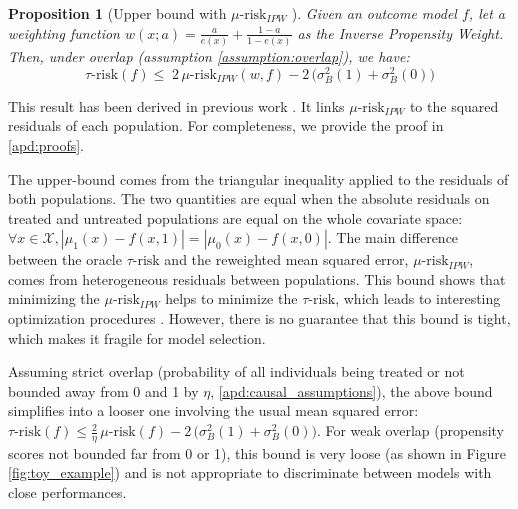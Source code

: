 \documentclass{report}
\newtheorem{proposition}{Proposition}
\begin{document}
\begin{proposition}[Upper bound with $\mu \text{-risk}_{IPW}$
  ]\label{theory:prop:mu_risk_ipw_bound}
  \citep{johansson2022generalization} Given an outcome model $f$, let a
  weighting function $w(x; a) = \frac{a}{e(x)} + \frac{1-a}{1-e(x)}$ as the
  Inverse Propensity Weight. Then, under overlap (assumption
  \ref{assumption:overlap}), we have:
  \begin{equation*}
    \tau\text{-risk}(f) \leq \; 2 \, \mu\text{-risk}_{IPW}(w, f)
    - 2 \, \big(\sigma^2_{B}(1) +  \sigma^2_{B}(0)\big)
  \end{equation*}
\end{proposition}
This result has been derived in previous work
\citep{johansson2022generalization}. It links $\mu\text{-risk}_{IPW}$ to
the squared residuals of each population. For completeness, we provide the proof in \ref{apd:proofs}.

The upper-bound comes from the triangular inequality applied to the residuals of
both populations. The two quantities are equal when the
absolute residuals on treated and untreated populations are equal on the
whole covariate space:
$\forall x \in \mathcal X, |\mu_1(x) - f(x, 1)| = |\mu_0(x) - f(x, 0)|$.
The main difference between the oracle $\tau \text{-risk}$ and the
reweighted mean squared error, $\mu\text{-risk}_{IPW}$, comes from heterogeneous
residuals between populations.
%
This bound shows that minimizing the $\mu\text{-risk}_{IPW}$ helps to
minimize the $\tau\text{-risk}$, which leads to
interesting optimization procedures \citep{johansson2022generalization}. However, there is no
guarantee that this bound is tight, which makes it fragile for model
selection.

Assuming strict overlap (probability of all individuals being treated or not
bounded away from 0 and 1 by $\eta$, \ref{apd:causal_assumptions}), the
above bound simplifies into a looser one involving the usual mean squared error:
$\tau\text{-risk}(f)\leq \frac{2}{\eta}\, \mu\text{-risk}(f) -  2 \, \big(\sigma^2_{B}(1) +  \sigma^2_{B}(0)\big)$. For weak overlap (propensity scores not bounded far from 0
or 1), this bound is very loose (as shown in Figure \ref{fig:toy_example})
and is not appropriate to discriminate between models with close performances.

\end{document}
